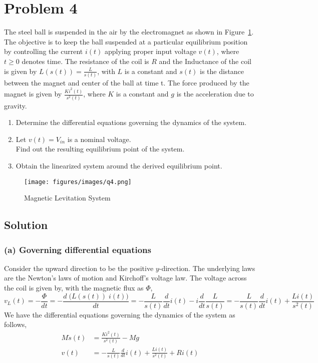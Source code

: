 \section*{Problem 4}

The steel ball is suspended in the air by the electromagnet as shown in Figure~\ref{fig:q4}.
The objective is to keep the ball suspended at a particular equilibrium position by controlling the current \(i(t)\) applying proper input voltage \(v(t)\), where \(t \geq 0\) denotes time.
The resistance of the coil is \(R\) and the Inductance of the coil is given by \(L(s(t)) = \frac{L}{s(t)}\), with \(L\) is a constant and \(s(t)\) is the distance between the magnet and center of the ball at time t.
The force produced by the magnet is given by \(\frac{K i^2(t)}{s^2(t)}\), where \(K\) is a constant and \(g\) is the acceleration due to gravity.

\begin{enumerate}[label= (\alph*)]
    \item Determine the differential equations governing the dynamics of the system.
    \item Let \(v(t) = V_{in}\) is a nominal voltage. \\
          Find out the resulting equilibrium point of the system.
    \item Obtain the linearized system around the derived equilibrium point.
\end{enumerate}

\begin{figure}[h]
    \centering
    \texttt{[image: figures/images/q4.png]}
    \caption{
        Magnetic Levitation System
    }\label{fig:q4}
\end{figure}

\clearpage
\subsection*{Solution}

\subsubsection*{(a) Governing differential equations}

Consider the upward direction to be the positive \(y\)-direction.
The underlying laws are the Newton's laws of motion and Kirchoff's voltage law.
The voltage across the coil is given by, with the magnetic flux as \( \Phi \),
\[
    v_L(t)
    = -\frac{\Phi}{dt}
    = -\frac{d\; \Big( L(s(t))\; i(t) \Big)}{dt}
    = -\frac{L}{s(t)} \frac{d}{dt} i(t)
    - i \frac{d}{dt} \frac{L}{s(t)}
    = -\frac{L}{s(t)} \frac{d}{dt} i(t)
    + \frac{Li(t)}{s^2(t)}
\]
We have the differential equations governing the dynamics of the system as follows,
\begin{align*}
    M \ddot s(t) & = \frac{Ki^2(t)}{s^2(t)} - Mg       \\
    v(t)         & = -\frac{L}{s(t)} \frac{d}{dt} i(t)
    + \frac{Li(t)}{s^2(t)} + R i(t)
\end{align*}

